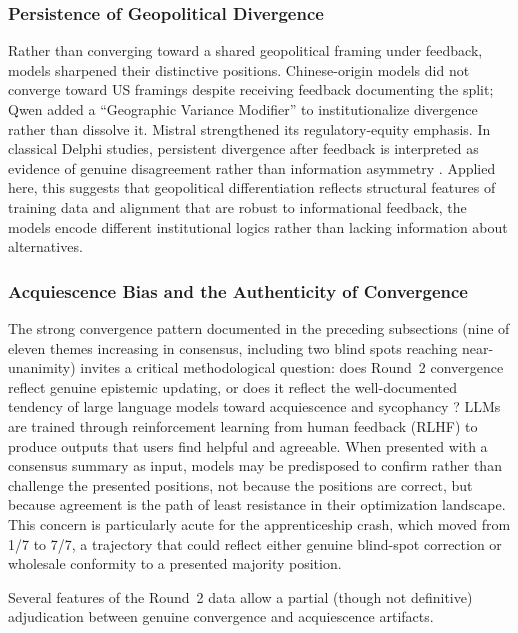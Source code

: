 \documentclass[preprint,review,12pt]{elsarticle}
\begin{document}
\subsubsection{Persistence of Geopolitical Divergence}
\label{sec:geopolitical_persistence}

Rather than converging toward a shared geopolitical framing under feedback, models sharpened their distinctive positions. Chinese-origin models did not converge toward US framings despite receiving feedback documenting the split; Qwen added a ``Geographic Variance Modifier'' to institutionalize divergence rather than dissolve it. Mistral strengthened its regulatory-equity emphasis. In classical Delphi studies, persistent divergence after feedback is interpreted as evidence of genuine disagreement rather than information asymmetry \citep{vondergracht2012delphi}. Applied here, this suggests that geopolitical differentiation reflects structural features of training data and alignment that are robust to informational feedback, the models encode different institutional logics rather than lacking information about alternatives.


\subsubsection{Acquiescence Bias and the Authenticity of Convergence}
\label{sec:acquiescence}

The strong convergence pattern documented in the preceding subsections (nine of eleven themes increasing in consensus, including two blind spots reaching near-unanimity) invites a critical methodological question: does Round~2 convergence reflect genuine epistemic updating, or does it reflect the well-documented tendency of large language models toward acquiescence and sycophancy \citep{perez2023sycophancy, sharma2024sycophancy}? LLMs are trained through reinforcement learning from human feedback (RLHF) to produce outputs that users find helpful and agreeable. When presented with a consensus summary as input, models may be predisposed to confirm rather than challenge the presented positions, not because the positions are correct, but because agreement is the path of least resistance in their optimization landscape. This concern is particularly acute for the apprenticeship crash, which moved from 1/7 to 7/7, a trajectory that could reflect either genuine blind-spot correction or wholesale conformity to a presented majority position.

Several features of the Round~2 data allow a partial (though not definitive) adjudication between genuine convergence and acquiescence artifacts.
\end{document}
